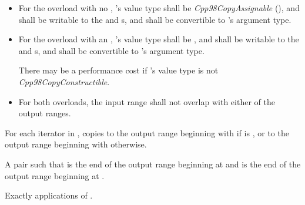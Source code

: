 \begin{itemdescr}
\pnum
\requires
\begin{itemize}
\item
For the overload with no , 's
value type shall be \textit{Cpp98CopyAssignable} (),
and shall be writable to the 
and  s, and shall be convertible to
's argument type.

\item
For the overload with an , 's
value type shall be , and shall be writable to the
 and  s, and shall be
convertible to 's argument type.
\begin{note}
There may be a performance cost if 's value type is not
\textit{Cpp98CopyConstructible}.
\end{note}

\item
For both overloads, the input range shall not overlap with either of the output ranges.
\end{itemize}

\pnum
\effects For each iterator  in , copies  to the output range beginning with  if  is , or to the output range beginning with  otherwise.

\pnum
\returns A pair  such that  is the end of the output range beginning at  and  is the end of the output range beginning at .

\pnum
\complexity Exactly  applications of .
\end{itemdescr}

